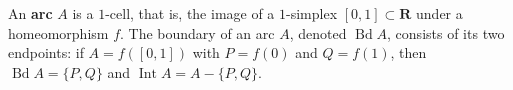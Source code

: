 An \textbf{arc} $A$ is a $1$-cell, that is, the image of a $1$-simplex $[0,1] \subset \mathbf{R}$ under a homeomorphism $f$. The boundary of an arc $A$, denoted $\operatorname{Bd} A$, consists of its two endpoints: if $A = f([0,1])$ with $P = f(0)$ and $Q = f(1)$, then $\operatorname{Bd} A = \{P, Q\}$ and $\operatorname{Int} A = A - \{P, Q\}$.
